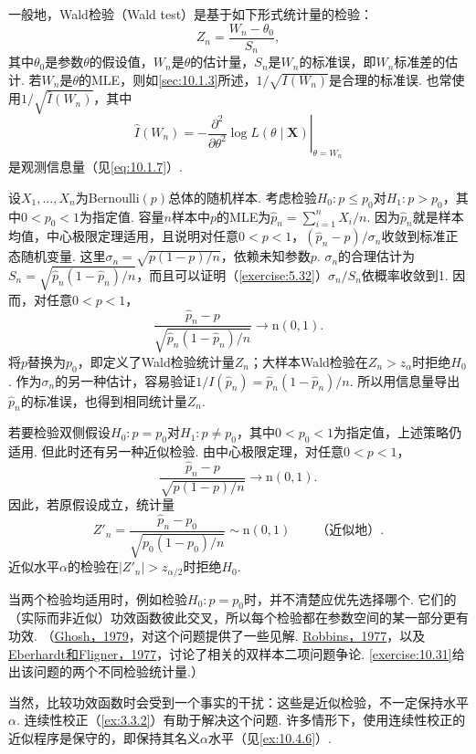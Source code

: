 一般地，Wald检验（Wald test）是基于如下形式统计量的检验：
$$Z_n=\frac{W_n-\theta_0}{S_n},$$
其中$\theta_0$是参数$\theta$的假设值，$W_n$是$\theta$的估计量，$S_n$是$W_n$的标准误，即$W_n$标准差的估计. 若$W_n$是$\theta$的MLE，则如\autoref{sec:10.1.3}所述，$1/\sqrt{I(W_n)}$是合理的标准误. 也常使用$1/\sqrt{\hat I(W_n)}$，其中
$$\hat I(W_n)=-\left.\frac{\partial^2}{\partial\theta^2}\log L(\theta\mid\boldsymbol X)\right|_{\theta=W_n}$$
是观测信息量（见\eqref{eq:10.1.7}）.

\begin{example}[大样本二项检验]\label{ex:10.3.5}
设$X_1,\ldots,X_n$为Bernoulli$(p)$总体的随机样本. 考虑检验$H_0:p\leq p_0$对$H_1:p>p_0$，其中$0<p_0<1$为指定值. 容量$n$样本中$p$的MLE为$\hat p_n=\sum_{i=1}^nX_i/n$. 因为$\hat p_n$就是样本均值，中心极限定理适用，且说明对任意$0<p<1$，$(\hat p_n-p)/\sigma_n$收敛到标准正态随机变量. 这里$\sigma_n=\sqrt{p(1-p)/n}$，依赖未知参数$p$.
$\sigma_n$的合理估计为$S_n=\sqrt{\hat p_n(1-\hat p_n)/n}$，而且可以证明（\autoref{exercise:5.32}）$\sigma_n/S_n$依概率收敛到1. 因而，对任意$0<p<1$，
$$\frac{\hat p_n-p}{\sqrt{\hat p_n(1-\hat p_n)/n}}\longrightarrow\mathrm n(0,1).$$
将$p$替换为$p_0$，即定义了Wald检验统计量$Z_n$；大样本Wald检验在$Z_n>z_\alpha$时拒绝$H_0$. 作为$\sigma_n$的另一种估计，容易验证$1/I(\hat p_n)=\hat p_n(1-\hat p_n)/n$. 所以用信息量导出$\hat p_n$的标准误，也得到相同统计量$Z_n$.

若要检验双侧假设$H_0:p=p_0$对$H_1:p\ne p_0$，其中$0<p_0<1$为指定值，上述策略仍适用. 但此时还有另一种近似检验. 由中心极限定理，对任意$0<p<1$，
$$\frac{\hat p_n-p}{\sqrt{p(1-p)/n}}\longrightarrow\mathrm n(0,1).$$
因此，若原假设成立，统计量
\begin{equation}\label{eq:10.3.4}
Z'_n=\frac{\hat p_n-p_0}{\sqrt{p_0(1-p_0)/n}}\sim\mathrm n(0,1)\qquad\text{（近似地）}.
\end{equation}
近似水平$\alpha$的检验在$|Z'_n|>z_{\alpha/2}$时拒绝$H_0$.

当两个检验均适用时，例如检验$H_0:p=p_0$时，并不清楚应优先选择哪个. 它们的（实际而非近似）功效函数彼此交叉，所以每个检验都在参数空间的某一部分更有功效. （\hyperref[bib:source139]{Ghosh，1979}，对这个问题提供了一些见解. \hyperref[bib:source254]{Robbins，1977}，以及\hyperref[bib:source105]{Eberhardt和Fligner，1977}，讨论了相关的双样本二项问题争论. \autoref{exercise:10.31}给出该问题的两个不同检验统计量.）

当然，比较功效函数时会受到一个事实的干扰：这些是近似检验，不一定保持水平$\alpha$. 连续性校正（\autoref{ex:3.3.2}）有助于解决这个问题. 许多情形下，使用连续性校正的近似程序是保守的，即保持其名义$\alpha$水平（见\autoref{ex:10.4.6}）.
\end{example}

